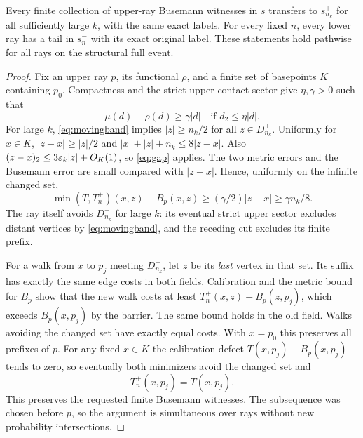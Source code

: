 \begin{lemma}\label{lem:splice}
Every finite collection of upper-ray Busemann witnesses in $s$ transfers
to $s_{n_k}^+$ for all sufficiently large $k$, with the same exact labels.
For every fixed $n$, every lower ray has a tail in $s_n^-$ with its exact
original label. These statements hold pathwise for all rays on the
structural full event.
\end{lemma}
\begin{proof}
Fix an upper ray $p$, its functional $\rho$, and a finite set of basepoints
$K$ containing $p_0$. Compactness and the strict upper contact sector give
$\eta,\gamma>0$ such that
\begin{equation}\label{eq:gap}
 \mu(d)-\rho(d)\ge\gamma|d|\quad\text{if }d_2\le\eta|d|.
\end{equation}
For large $k$, \eqref{eq:movingband} implies $|z|\ge n_k/2$ for all
$z\in D_{n_k}^+$. Uniformly for $x\in K$, $|z-x|\ge|z|/2$ and
$|x|+|z|+n_k\le8|z-x|$. Also
$(z-x)_2\le3\varepsilon_k|z|+O_K(1)$, so \eqref{eq:gap} applies.
The two metric errors and the Busemann error are small compared with
$|z-x|$. Hence, uniformly on the infinite changed set,
\begin{equation}\label{eq:movingbarrier}
 \min(T,T_n^+)(x,z)-B_p(x,z)
 \ge(\gamma/2)|z-x|\ge\gamma n_k/8.
\end{equation}
The ray itself avoids $D_{n_k}^+$ for large $k$: its eventual strict upper
sector excludes distant vertices by \eqref{eq:movingband}, and the receding
cut excludes its finite prefix.

For a walk from $x$ to $p_j$ meeting $D_{n_k}^+$, let $z$ be its \emph{last}
vertex in that set. Its suffix has exactly the same edge costs in both
fields. Calibration and the metric bound for $B_p$ show that the new walk
costs at least $T_n^+(x,z)+B_p(z,p_j)$, which exceeds
$B_p(x,p_j)$ by the barrier. The same bound holds in the old field. Walks
avoiding the changed set have exactly equal costs. With $x=p_0$ this preserves
all prefixes of $p$. For any fixed $x\in K$ the calibration defect
$T(x,p_j)-B_p(x,p_j)$ tends to zero, so eventually both minimizers avoid
the changed set and
\begin{equation}\label{eq:distanceshare}
 T_n^+(x,p_j)=T(x,p_j).
\end{equation}
This preserves the requested finite Busemann witnesses. The subsequence
was chosen before $p$, so the argument is simultaneous over rays without
new probability intersections.


\end{proof}
